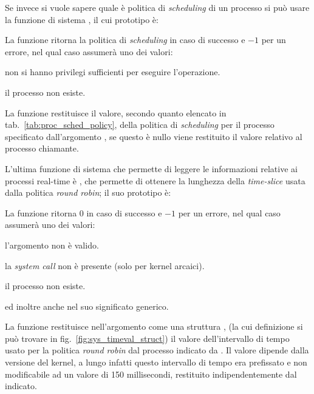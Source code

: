 Se invece si vuole sapere quale è politica di \textit{scheduling} di un
processo si può usare la funzione di sistema , il
cui prototipo è:

\begin{funcproto}{ 
}
{La funzione ritorna la politica di \textit{scheduling}  in caso di successo e
  $-1$ per un errore, nel qual caso  assumerà uno dei valori:
\begin{errlist}
    \item[\errcode{EPERM}] non si hanno privilegi sufficienti per eseguire
      l'operazione.
    \item[\errcode{ESRCH}] il processo  non esiste.
\end{errlist}}
\end{funcproto}

La funzione restituisce il valore, secondo quanto elencato in
tab.~\ref{tab:proc_sched_policy}, della politica di \textit{scheduling} per il
processo specificato dall'argomento , se questo è nullo viene
restituito il valore relativo al processo chiamante.

L'ultima funzione di sistema che permette di leggere le informazioni relative
ai processi real-time è , che permette di
ottenere la lunghezza della \textit{time-slice} usata dalla politica
\textit{round robin}; il suo prototipo è:

\begin{funcproto}{ 
}
{La funzione ritorna $0$ in caso di successo e $-1$ per un errore, nel qual
caso  assumerà uno dei valori:
\begin{errlist}
\item[\errcode{EINVAL}] l'argomento  non è valido. 
\item[\errcode{ENOSYS}] la \textit{system call} non è presente (solo per
  kernel arcaici).
\item[\errcode{ESRCH}] il processo  non esiste.
\end{errlist}
ed inoltre anche  nel suo significato generico.}
\end{funcproto}

La funzione restituisce nell'argomento  come una struttura
, (la cui definizione si può trovare in
fig.~\ref{fig:sys_timeval_struct}) il valore dell'intervallo di tempo usato
per la politica \textit{round robin} dal processo indicato da . Il
valore dipende dalla versione del kernel, a lungo infatti questo intervallo di
tempo era prefissato e non modificabile ad un valore di 150 millisecondi,
restituito indipendentemente dal  indicato. 

